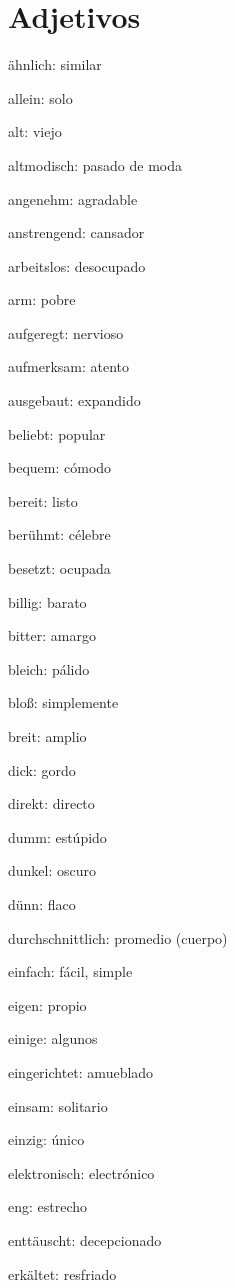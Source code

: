 \section{Adjetivos}
\begin{multicols}{2}
\begin{myitemize}
\item ähnlich: similar
\item allein: solo
\item alt: viejo
\item altmodisch: pasado de moda
\item angenehm: agradable
\item anstrengend: cansador
\item arbeitslos: desocupado
\item arm: pobre
\item aufgeregt: nervioso
\item aufmerksam: atento
\item ausgebaut: expandido
\item beliebt: popular
\item bequem: cómodo
\item bereit: listo
\item berühmt: célebre
\item besetzt: ocupada
\item billig: barato
\item bitter: amargo
\item bleich: pálido
\item bloß: simplemente
\item breit: amplio
\item dick: gordo
\item direkt: directo
\item dumm: estúpido
\item dunkel: oscuro
\item dünn: flaco
\item durchschnittlich: promedio (cuerpo)
\item einfach: fácil, simple
\item eigen: propio
\item einige: algunos
\item eingerichtet: amueblado
\item einsam: solitario
\item einzig: único
\item elektronisch: electrónico
\item eng: estrecho
\item enttäuscht: decepcionado
\item erkältet: resfriado

\end{myitemize}
\end{multicols}
